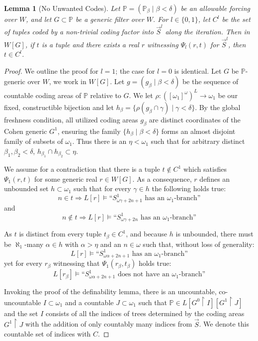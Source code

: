 \documentclass{article}
\theoremstyle{plain}
\newtheorem{lemma}[theorem]{Lemma}
\theoremstyle{definition}
\begin{document}
\begin{lemma}[No Unwanted Codes] \label{Lemma:NoUnwantedCodes}
Let $\mathbb{P} = (\mathbb{P}_\beta \mid \beta < \delta)$ be an allowable forcing over $W$, and let $G \subset \mathbb{P}$ be a generic filter over $W$. For $l \in \{0,1\}$, let $C^l$ be the set of tuples coded by a non-trivial coding factor into $\vec{S}^l$ along the iteration. Then in $W[G]$, if $t$ is a tuple and there exists a real $r$ witnessing $\Psi_l(r, t)$ for $\vec{S}^l$, then $t \in C^l$.
\end{lemma}

\begin{proof}
We outline the proof for $l=1$; the case for $l=0$ is identical. Let $G$ be $\mathbb{P}$-generic over $W$, we work in $W[G]$. Let $g= (g_{\beta} \mid \beta < \delta)$ be the sequence of countable coding areas of $\mathbb{P}$ relative to $G$. We let $\rho: ([\omega_1]^{\omega})^L \rightarrow \omega_1$ be our fixed, constructible bijection and let $h_{\beta}= \{\rho(g_{\beta} \cap \gamma) \mid \gamma < \delta\}$. By the global freshness condition, all utilized coding areas $g_{\beta}$ are distinct coordinates of the Cohen generic $G^1$, ensuring the family $\{h_{\beta} \mid \beta < \delta\}$ forms an almost disjoint family of subsets of $\omega_1$. Thus there is an $\eta < \omega_1$ such that for arbitrary distinct $\beta_1, \beta_2 < \delta$, $h_{\beta_1}\cap h_{\beta_2} \subset \eta$.

We assume for a contradiction that there is a tuple $t \notin C^1$ which satisfies $\Psi_1(r, t)$ for some generic real $r \in W[G]$. As a consequence, $r$ defines an unbounded set $h \subset \omega_1$ such that for every $\gamma \in h$ the following holds true:
$$n \in t \Rightarrow L[r] \models \text{``}S^1_{\omega \gamma + 2n+1} \text{ has an } \omega_1\text{-branch''}$$
and
$$n \notin t \Rightarrow L[r] \models \text{``}S^1_{\omega \gamma + 2n} \text{ has an } \omega_1\text{-branch''}$$

As $t$ is distinct from every tuple $t_\beta \in C^1$, and because $h$ is unbounded, there must be $\aleph_1$-many $\alpha \in h$ with $\alpha > \eta$ and an $n \in \omega$ such that, without loss of generality:
$$L[r] \models \text{``}S^1_{\omega \alpha + 2n+1} \text{ has an } \omega_1\text{-branch''}$$
yet for every $r_{\beta}$ witnessing that $\Psi_1(r_{\beta}, t_{\beta})$ holds true:
$$L[r_{\beta}] \models \text{``}S^1_{\omega \alpha + 2n+1} \text{ does not have an } \omega_1\text{-branch''}$$

Invoking the proof of the definability lemma, there is an uncountable, co-uncountable $I \subset \omega_1$ and a countable $J \subset \omega_1$ such that $\mathbb{P} \in L[G^0 \restriction I][G^1 \restriction J]$ and the set $I$ consists of all the indices of trees determined by the coding areas $G^1 \restriction J$ with the addition of only countably many indices from $\vec{S}$. We denote this countable set of indices with $C$.


\end{proof}
\end{document}
